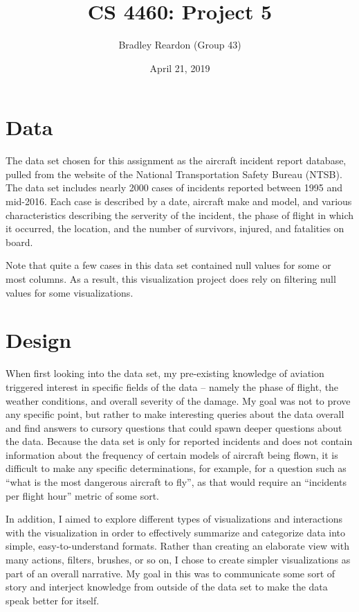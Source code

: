 \documentclass{article}
\title{\textbf{CS 4460:} Project 5}
\author{Bradley Reardon (Group 43)}
\date{April 21, 2019}
\begin{document}
  \maketitle

  \section{Data}
    The data set chosen for this assignment as the aircraft incident report database, pulled from the website of the National Transportation Safety Bureau (NTSB). The data set includes nearly 2000 cases of incidents reported between 1995 and mid-2016. Each case is described by a date, aircraft make and model, and various characteristics describing the serverity of the incident, the phase of flight in which it occurred, the location, and the number of survivors, injured, and fatalities on board.

    Note that quite a few cases in this data set contained null values for some or most columns. As a result, this visualization project does rely on filtering null values for some visualizations.

  \section{Design}
    When first looking into the data set, my pre-existing knowledge of aviation triggered interest in specific fields of the data -- namely the phase of flight, the weather conditions, and overall severity of the damage. My goal was not to prove any specific point, but rather to make interesting queries about the data overall and find answers to cursory questions that could spawn deeper questions about the data. Because the data set is only for reported incidents and does not contain information about the frequency of certain models of aircraft being flown, it is difficult to make any specific determinations, for example, for a question such as ``what is the most dangerous aircraft to fly'', as that would require an ``incidents per flight hour'' metric of some sort.

    In addition, I aimed to explore different types of visualizations and interactions with the visualization in order to effectively summarize and categorize data into simple, easy-to-understand formats. Rather than creating an elaborate view with many actions, filters, brushes, or so on, I chose to create simpler visualizations as part of an overall narrative. My goal in this was to communicate some sort of story and interject knowledge from outside of the data set to make the data speak better for itself.
\end{document}
